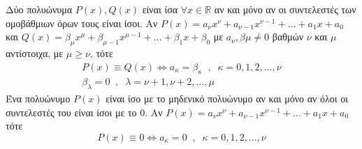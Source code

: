 \documentclass[twoside,10pt]{book}
\begin{document}
Δύο πολυώνυμα $ P(x),Q(x) $ είναι ίσα $ \forall x\in\mathbb{R} $ αν και μόνο αν οι συντελεστές των ομοβάθμιων όρων τους είναι ίσοι. Αν $ P(x)=a_\nu x^\nu+a_{\nu-1}x^{\nu-1}+\ldots+a_1x+a_0 $ και $ Q(x)=\beta_\mu x^\mu+\beta_{\mu-1}x^{\mu-1}+\ldots+\beta_1x+\beta_0 $ με $ a_\nu,\beta\mu\neq0 $ βαθμών $ \nu $ και $ \mu $ αντίστοιχα, με $ \mu\geq\nu $, τότε 
\begin{gather*}
P(x)\equiv Q(x)\Leftrightarrow a_\kappa=\beta_\kappa\;\;,\;\;\kappa=0,1,2,\ldots,\nu\\
\beta_\lambda=0\;\;,\;\;\lambda=\nu+1,\nu+2,\ldots,\mu
\end{gather*}
Ένα πολυώνυμο $ P(x) $ είναι ίσο με το μηδενικό πολυώνυμο αν και μόνο αν όλοι οι συντελεστές του είναι ίσοι με το 0. Αν $ P(x)=a_\nu x^\nu+a_{\nu-1}x^{\nu-1}+\ldots+a_1x+a_0 $ τότε
\[ P(x)\equiv0\Leftrightarrow a_\kappa=0\;\;,\;\;\kappa=0,1,2,\ldots,\nu \]
\end{document}
